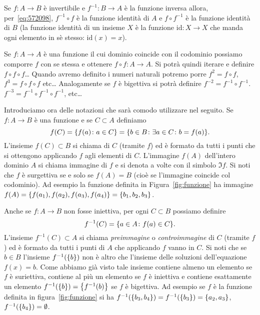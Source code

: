 Se $f\colon A\to B$ è invertibile e $f^{-1}\colon B\to A$ è la funzione 
inversa allora, per~\eqref{eq:572098}, 
$f^{-1}\circ f$ è la funzione identità di $A$
e $f\circ f^{-1}$ è la funzione identità di $B$
(la funzione identità di un insieme $X$ 
è la funzione $\mathrm{id}\colon X\to X$ che manda ogni elemento in sè stesso: $\mathrm{id}(x) = x$).

Se $f\colon A\to A$ è una funzione il cui dominio coincide con il codominio
possiamo comporre $f$ con se stessa e ottenere $f\circ f \colon A\to A$.
Si potrà quindi iterare e definire $f\circ f \circ f$\dots
Quando avremo definito i numeri naturali potremo porre $f^2 = f\circ f$,
$f^3= f\circ f \circ f$ etc\dots
Analogamente se $f$ è bigettiva si potrà definire $f^{-2} = f^{-1}\circ f^{-1}$.
$f^{-3}=f^{-1}\circ f^{-1}\circ f^{-1}$, etc\dots

Introduciamo ora delle notazioni che sarà comodo utilizzare nel seguito.
Se $f\colon A \to B$ è una funzione e se $C\subset A$ definiamo
\[
  f(C) = {\left\{ f(a)\colon a \in C \right\}} = {\left\{ b\in B\colon \exists a\in C\colon b=f(a) \right\}}.
\]
L'insieme $f(C)\subset B$ si chiama 
%
di $C$ (tramite $f$) ed è formato
da tutti i punti che si ottengono applicando $f$ agli elementi di $C$.
L'immagine $f(A)$ dell'intero dominio $A$ si chiama immagine di $f$
e si denota a volte con il simbolo $\Im f$.
Si noti che $f$ è surgettiva se e solo se $f(A)=B$ (cioè se l'immagine coincide
col codominio).
Ad esempio la funzione definita in Figura~\ref{fig:funzione}
ha immagine $f(A) = {\left\{ f(a_1),f(a_2),f(a_3),f(a_4) \right\}} 
 = {\left\{ b_1, b_2, b_3 \right\}}$.

Anche se $f\colon A \to B$ non fosse iniettiva,
per ogni $C\subset B$ possiamo definire
\[
  f^{-1}(C) = {\left\{ a\in A\colon f(a) \in C \right\}}.
\]
L'insieme $f^{-1}(C)\subset A$ si chiama \emph{preimmagine}
o \emph{controimmagine}
%
%
%
%
di $C$ (tramite $f$)
ed è formato da tutti i punti di $A$ che applicando $f$ vanno in $C$.
Si noti che se $b\in B$ l'insieme $f^{-1}({\left\{ b \right\}})$ non è altro che
l'insieme delle soluzioni dell'equazione $f(x)=b$. Come abbiamo
già visto tale insieme contiene almeno un elemento se $f$ è suriettiva,
contiene al più un elemento se $f$ è iniettiva e contiene esattamente
un elemento $f^{-1}({\left\{ b \right\}}) = {\left\{ f^{-1}(b) \right\}}$ se $f$ è bigettiva.
Ad esempio se $f$ è la funzione definita in figura~\ref{fig:funzione}
si ha $f^{-1}({\left\{ b_3,b_4 \right\}}) = f^{-1}({\left\{ b_3 \right\}}) = {\left\{ a_2,a_3 \right\}}$,
$f^{-1}({\left\{ b_4 \right\}}) = \emptyset$.


